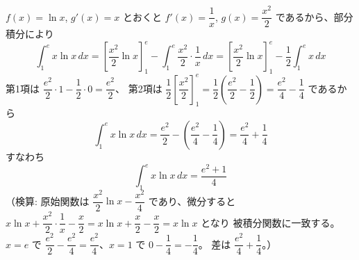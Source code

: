 
$f(x) = \ln x$, $g'(x) = x$ とおくと $f'(x) = \dfrac{1}{x}$, $g(x) = \dfrac{x^{2}}{2}$ であるから、部分積分により
\[
\int_{1}^{e} x\ln x\,dx
= \left[\frac{x^{2}}{2}\ln x\right]_{1}^{e} - \int_{1}^{e} \frac{x^{2}}{2}\cdot\frac{1}{x}\,dx
= \left[\frac{x^{2}}{2}\ln x\right]_{1}^{e} - \frac{1}{2}\int_{1}^{e} x\,dx
\]
第1項は $\dfrac{e^{2}}{2}\cdot 1 - \dfrac{1}{2}\cdot 0 = \dfrac{e^{2}}{2}$、
第2項は $\dfrac{1}{2}\left[\dfrac{x^{2}}{2}\right]_{1}^{e} = \dfrac{1}{2}\left(\dfrac{e^{2}}{2} - \dfrac{1}{2}\right) = \dfrac{e^{2}}{4} - \dfrac{1}{4}$
であるから
\[
\int_{1}^{e} x\ln x\,dx = \frac{e^{2}}{2} - \left(\frac{e^{2}}{4} - \frac{1}{4}\right) = \frac{e^{2}}{4} + \frac{1}{4}
\]
すなわち
\[
\boxed{\; \int_{1}^{e} x\ln x\,dx = \frac{e^{2}+1}{4} \;}
\]
（検算: 原始関数は $\dfrac{x^{2}}{2}\ln x - \dfrac{x^{2}}{4}$ であり、微分すると
$x\ln x + \dfrac{x^{2}}{2}\cdot\dfrac{1}{x} - \dfrac{x}{2} = x\ln x + \dfrac{x}{2} - \dfrac{x}{2} = x\ln x$ となり
被積分関数に一致する。$x=e$ で $\dfrac{e^2}{2}-\dfrac{e^2}{4}=\dfrac{e^2}{4}$、$x=1$ で $0-\dfrac14=-\dfrac14$。
差は $\dfrac{e^2}{4}+\dfrac14$。）
